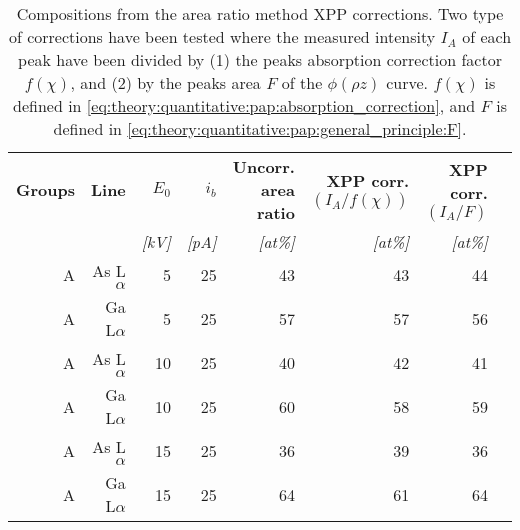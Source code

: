 \begin{table}[phtb]
    \begin{center}
        \caption{
            Compositions from the area ratio method XPP corrections.
            Two type of corrections have been tested where the measured intensity $I_A$ of each peak have been divided by (1) the peaks absorption correction factor $f(\chi)$, and (2) by the peaks area $F$ of the $\phi(\rho z)$ curve.
            $f(\chi)$ is defined in \cref{eq:theory:quantitative:pap:absorption_correction}, and $F$ is defined in \cref{eq:theory:quantitative:pap:general_principle:F}.
        }
        \label{tab:results:XPP_compositions}
        \begin{tabular}{rrrrrrrr}
            \hline
            \textbf{Groups} & \textbf{Line} & \textbf{$E_0$} & \textbf{$i_b$} & \textbf{Uncorr. area ratio} & \textbf{XPP corr. $(I_A/f(\chi))$} & \textbf{XPP corr. $(I_A/F)$} \\
            \emph{}         & \emph{}       & \emph{[kV]}    & \emph{[pA]}    & \emph{[at\%]}               & \emph{[at\%]}                      & \emph{[at\%]}                \\
            \hline
            A               & As L$\alpha$  & 5              & 25             & 43                          & 43                                 & 44                           \\
            A               & Ga L$\alpha$  & 5              & 25             & 57                          & 57                                 & 56                           \\
            A               & As L$\alpha$  & 10             & 25             & 40                          & 42                                 & 41                           \\
            A               & Ga L$\alpha$  & 10             & 25             & 60                          & 58                                 & 59                           \\
            A               & As L$\alpha$  & 15             & 25             & 36                          & 39                                 & 36                           \\
            A               & Ga L$\alpha$  & 15             & 25             & 64                          & 61                                 & 64                           \\

\end{tabular}
\end{center}
\end{table}
